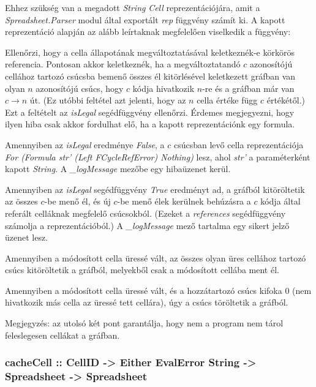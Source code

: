 Ehhez szükség van a megadott \textit{String} \textit{Cell} reprezentációjára, amit a \textit{Spreadsheet.Parser} modul által exportált \textit{rep} függvény számít ki. A kapott reprezentáció alapján az alább leírtaknak megfelelően viselkedik a függvény:

\begin{compactenum}
	\item Ellenőrzi, hogy a cella állapotának megváltoztatásával keletkeznék-e 		körkörös referencia. Pontosan akkor keletkeznék, ha a megváltoztatandó $c$ 	azonosítójú cellához tartozó csúcsba bemenő összes él kitörlésével keletkezett gráfban van olyan $n$ azonosítójú csúcs, hogy $c$ kódja hivatkozik $n$-re és a gráfban már van $c \rightarrow n$ út. (Ez utóbbi feltétel azt jelenti, hogy az $n$ cella értéke függ $c$ értékétől.) Ezt a feltételt az \textit{isLegal} segédfüggvény ellenőrzi. Érdemes megjegyezni, hogy ilyen hiba csak akkor fordulhat elő, ha a kapott reprezentációnk egy formula.
	\item Amennyiben az \textit{isLegal} eredménye \textit{False}, a $c$ csúcsban levő cella reprezentációja \textit{For (Formula str' (Left FCycleRefError) Nothing)} lesz, ahol \textit{str'} a paraméterként kapott \textit{String}. A \textit{\_logMessage} mezőbe egy hibaüzenet kerül.
	\item Amennyiben az \textit{isLegal} segédfüggvény \textit{True} eredményt ad, a gráfból kitöröltetik az összes $c$-be menő él, és új $c$-be menő élek kerülnek behúzásra a $c$ kódja által referált celláknak megfelelő csúcsokból. (Ezeket a \textit{references} segédfüggvény számolja a reprezentációból.) A \textit{\_logMessage} mező tartalma egy sikert jelző üzenet lesz.
	\item Amennyiben a módosított cella üressé vált, az összes olyan üres cellához tartozó csúcs kitöröltetik a gráfból, melyekből csak a módosított cellába ment él.
	\item Amennyiben a módosított cella üressé vált, és a hozzátartozó csúcs kifoka 0 (nem hivatkozik más cella az üressé tett cellára), úgy a csúcs töröltetik a gráfból.
\end{compactenum}

Megjegyzés: az utolsó két pont garantálja, hogy nem a program nem tárol feleslegesen cellákat a gráfban.

\subsubsection{cacheCell :: CellID -> Either EvalError String -> Spreadsheet -> Spreadsheet}

